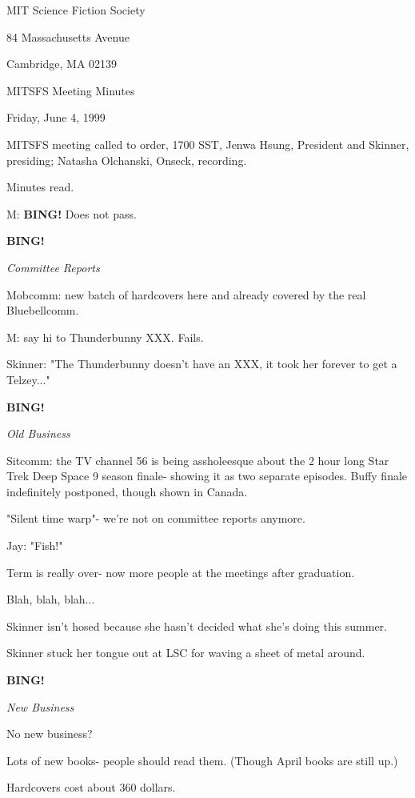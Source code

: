 \documentclass[12pt]{article}
\newcommand{\bing}{{\bf BING!} }
\newcommand{\goto}[1]{\bing \vskip 12pt \centerline{{\em{#1}}}}
\begin{document}
\begin{center}

MIT Science Fiction Society 

84 Massachusetts Avenue

Cambridge, MA 02139

\vspace{12pt}

MITSFS Meeting Minutes 

Friday, June 4, 1999

\end{center}
 
\vspace{18pt}

\setlength{\parskip}{6pt}

\noindent
MITSFS meeting called to order, 1700 SST,
Jenwa Hsung, President and Skinner, presiding; Natasha Olchanski, Onseck, recording.

Minutes read.

M: \bing Does not pass.

\goto{Committee Reports}

Mobcomm: new batch of hardcovers here and already covered by the real Bluebellcomm.

M: say hi to Thunderbunny XXX. Fails.

Skinner: "The Thunderbunny doesn't have an XXX, it took her forever to get a Telzey..."

\goto{Old Business}

Sitcomm: the TV channel 56 is being assholeesque about the 2 hour long Star Trek Deep Space 9 season finale- showing it as two separate episodes. Buffy finale indefinitely postponed, though shown in Canada.

"Silent time warp"- we're not on committee reports anymore.

Jay: "Fish!"

Term is really over- now more people at the meetings after graduation.

Blah, blah, blah...

Skinner isn't hosed because she hasn't decided what she's doing this summer.

Skinner stuck her tongue out at LSC for waving a sheet of metal around.

\goto{New Business}

No new business?

Lots of new books- people should read them. (Though April books are still up.)

Hardcovers cost about 360 dollars.
\end{document}
